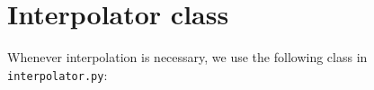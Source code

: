 \section{Interpolator class}

Whenever interpolation is necessary, we use the following class in \texttt{interpolator.py}:

